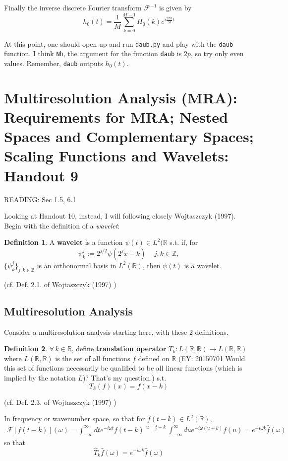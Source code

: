 \documentclass[twoside]{amsart}
\theoremstyle{plain}
\theoremstyle{definition}
\newtheorem{definition}{Definition}
\theoremstyle{remark}
\numberwithin{equation}{section}
\begin{document}
Finally the inverse discrete Fourier transform $\mathcal{F}^{-1}$ is given by 
\[
h_0(t) = \frac{1}{M} \sum_{k=0}^{M-1} H_0(k) e^{ i \frac{2\pi k}{M} t}
\]  

At this point, one should open up and run \verb|daub.py| and play with the \verb|daub| function.  I think \verb|Nh|, the argument for the function \verb|daub| is $2p$, so try only even values.  Remember, \verb|daub| outputs $h_0(t)$.  

\section{Multiresolution Analysis (MRA): Requirements for MRA; Nested Spaces and Complementary Spaces; Scaling Functions and Wavelets: Handout 9}

READING: Sec 1.5, 6.1 \cite{GStrangTNguyen1996}

Looking at Handout 10, instead, I will following closely Wojtaszczyk (1997)\cite{PWojtaszczyk1997}.  
Begin with the definition of a \emph{wavelet}:
\begin{definition}
 A \textbf{wavelet} is a function $\psi(t) \in L^2(\mathbb{R}$ s.t. if, for 
\[
\psi^j_k := 2^{j/2} \psi(2^jx - k) \quad \, j,k \in \mathbb{Z},
\]
$\lbrace \psi^j_k \rbrace_{j,k \in \mathbb{Z}}$ is an orthonormal basis in $L^2(\mathbb{R})$, then $\psi(t)$ is a wavelet.
\end{definition}
(cf. Def. 2.1. of Wojtaszczyk (1997) \cite{PWojtaszczyk1997})

\subsection{Multiresolution Analysis}

Consider a multiresolution analysis starting here, with these 2 definitions.  

\begin{definition}
$\forall \, k \in \mathbb{R}$, define \textbf{translation operator} $T_k : L(\mathbb{R}, \mathbb{R}) \to L(\mathbb{R}, \mathbb{R})$ where $L(\mathbb{R}, \mathbb{R})$ is the set of all functions $f$ defined on $\mathbb{R}$  (EY: 20150701 Would this set of functions necessarily be qualified to be all linear functions (which is implied by the notation $L$)? That's my question.) s.t.
\[
T_k(f)(x) = f(x-k)
\]
\end{definition} (cf. Def. 2.3. of Wojtaszczyk (1997) \cite{PWojtaszczyk1997})

In frequency or wavenumber space, so that for $f(t-k) \in L^2(\mathbb{R})$,
\[
\begin{gathered}
  \mathcal{F}[f(t-k)](\omega) = \int_{-\infty}^{\infty} dt e^{-i\omega t} f(t-k) \overset{ u = t-k}{=} \int_{-\infty}^{\infty} du e^{-i\omega ( u + k) } f(u) = e^{-i \omega k } \widehat{f}(\omega)
\end{gathered}
\]
so that 
\[
\widehat{T}_k \widehat{f}(\omega) = e^{-i \omega k } \widehat{f}(\omega)
\]
\end{document}
